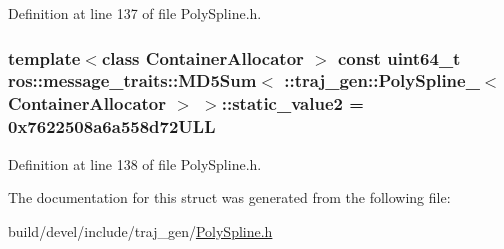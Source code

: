 Definition at line 137 of file Poly\+Spline.\+h.

\subsubsection[{\texorpdfstring{static\+\_\+value2}{static_value2}}]{\setlength{\rightskip}{0pt plus 5cm}template$<$class Container\+Allocator $>$ const uint64\+\_\+t ros\+::message\+\_\+traits\+::\+M\+D5\+Sum$<$ \+::{\bf traj\+\_\+gen\+::\+Poly\+Spline\+\_\+}$<$ Container\+Allocator $>$ $>$\+::static\+\_\+value2 = 0x7622508a6a558d72\+U\+LL\hspace{0.3cm}{\ttfamily [static]}}\hypertarget{structros_1_1message__traits_1_1_m_d5_sum_3_01_1_1traj__gen_1_1_poly_spline___3_01_container_allocator_01_4_01_4_a21950104357133decca1c2a10edddc78}{}\label{structros_1_1message__traits_1_1_m_d5_sum_3_01_1_1traj__gen_1_1_poly_spline___3_01_container_allocator_01_4_01_4_a21950104357133decca1c2a10edddc78}


Definition at line 138 of file Poly\+Spline.\+h.



The documentation for this struct was generated from the following file\+:\begin{DoxyCompactItemize}
\item 
build/devel/include/traj\+\_\+gen/\hyperlink{_poly_spline_8h}{Poly\+Spline.\+h}\end{DoxyCompactItemize}
